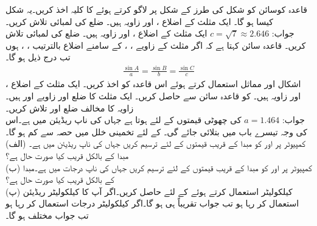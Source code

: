 قاعدہ کوسائن کو شکل  کی طرز کے شکل پر لاگو کرتے ہوئے  کا کلیہ اخذ کریں۔یہ شکل کیسا ہو گا۔ 
\quad
ایک مثلث کے اضلاع ،  اور زاویہ  ہیں۔  ضلع  کی لمبائی تلاش کریں۔ \\
جواب:\quad
$c=\sqrt{7}\approx 2.646$
\quad
ایک مثلث کے اضلاع ،  اور زاویہ  ہیں۔  ضلع  کی لمبائی تلاش کریں۔ 
\quad
قاعدہ سائن کہتا ہے کہ اگر مثلث کے زاویے ، ،  کے سامنے اضلاع بالترتیب ، ،  ہوں تب درج ذیل ہو گا۔
\begin{align*}
\tfrac{\sin A}{a}=\tfrac{\sin B}{b}=\tfrac{\sin C}{c}
\end{align*} 
اشکال  اور مماثل  استعمال کرتے ہوئے اس قاعدہ کو اخذ کریں۔
 \quad
ایک مثلث کے اضلاع ،  اور زاویہ  ہیں۔   کو قاعدہ سائن سے حاصل کریں۔
\quad
ایک مثلث کا ضلع  اور زاویے   اور  ہیں۔زاویہ  کا مخالف ضلع  اور  تلاش کریں۔\\
جواب:\quad
$a=1.464$
   
\quad
{} کی چھوٹی قیمتوں کے لئے  ہوتا ہے جہاں  کی ناپ ریڈیئن میں ہے۔اس کی وجہ تیسرے باب میں بتلائی جائے گی۔  کے لئے تخمینی خلل  میں  حصہ سے کم ہو گا۔\\
(الف)\quad
کمپیوٹر پر  اور  کو مبدا کے قریب قیمتوں کے لئے ترسیم کریں جہاں  کی ناپ ریڈیئن میں ہے۔مبدا کے بالکل قریب کیا صورت حال ہے؟\\
(ب)\quad
کمپیوٹر پر  اور  کو مبدا کے قریب قیمتوں کے لئے ترسیم کریں جہاں  کی ناپ درجات میں ہے۔مبدا کے بالکل قریب کیا صورت حال ہے؟\\
(پ)\quad
کیلکولیٹر استعمال کرتے ہوئے  کے لئے  حاصل کریں۔اگر آپ کا کیلکولیٹر ریڈیئن استعمال کر رہا ہو تب جواب تقریباً  ہی ہو گا۔اگر کیلکولیٹر درجات استعمال کر رہا ہو تب جواب مختلف ہو گا۔


